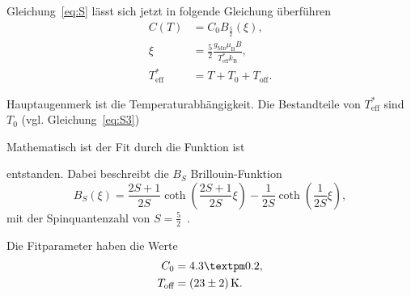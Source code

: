 Gleichung~\ref{eq:S} lässt sich jetzt in folgende Gleichung überführen
\begin{align}
    C(T)&= C_0 B_\text{$\frac{5}{2}$} (\xi)\text{,} \\
    \xi &= \frac{5}{2}\frac{g_\text{Mn} \mu_\text{B} B }{T^*_\text{eff} k_\text{B}}\text{,} \\
    T^*_\text{eff} &= T + T_0 + T_\text{off}\text{.}
\end{align}

Hauptaugenmerk ist die Temperaturabhängigkeit.
Die Bestandteile von $T^*_\text{eff}$ sind $T_0$ (vgl. Gleichung~\ref{eq:S3}) 








\newpage
Mathematisch ist der Fit durch die Funktion ist

entstanden.
Dabei beschreibt die $B_S$ Brillouin-Funktion 
\begin{equation}
    B_S(\xi) = \frac{2S+1}{2S}\coth\left(\frac{2S+1}{2S}\xi\right) - \frac{1}{2S}\coth(\frac{1}{2S}\xi),
\end{equation}
mit der Spinquantenzahl von $ S = \frac{5}{2}$~\cite{felix}.


Die Fitparameter haben die Werte 
\begin{align}
    C_0 & = 4.3 ± 0.2, \\
    T_\text{off} & = \SI{ 23 \pm 2}{\kelvin}. 
\end{align}